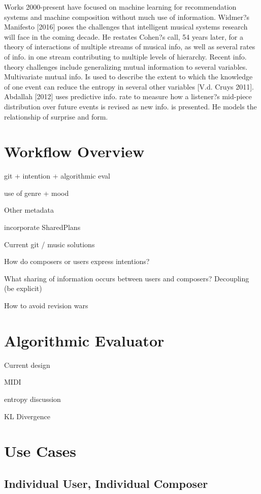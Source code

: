 \documentclass[final,authoryear,11pt,times]{elsarticle}
\begin{document}
Works 2000-present have focused on machine learning for recommendation systems and machine composition without much use of information. Widmer?s Manifesto [2016] poses the challenges that intelligent musical systems research will face in the coming decade. He restates Cohen?s call, 54 years later, for a theory of interactions of multiple streams of musical info, as well as several rates of info. in one stream contributing to multiple levels of hierarchy. Recent info. theory challenges include generalizing mutual information to several variables. Multivariate mutual info. Is used to describe the extent to which the knowledge of one event can reduce the entropy in several other variables [V.d. Cruys 2011]. Abdallah [2012] uses predictive info. rate to measure how a listener?s mid-piece distribution over future events is revised as new info. is presented. He models the relationship of surprise and form.






\section{Workflow Overview}

git + intention + algorithmic eval

use of genre + mood

Other metadata

incorporate SharedPlans

Current git / music solutions

How do composers or users express intentions?

What sharing of information occurs between users and composers? Decoupling (be explicit)

How to avoid revision wars

\section{Algorithmic Evaluator}

Current design

MIDI

entropy discussion

KL Divergence

\section{Use Cases}

\subsection{Individual User, Individual Composer}
\end{document}
